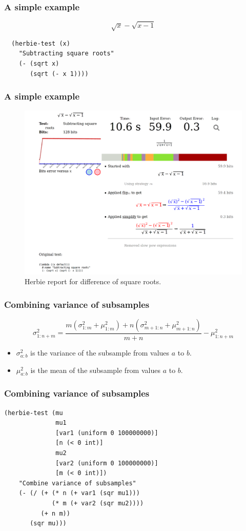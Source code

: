 \documentclass{beamer}
\begin{document}
\begin{frame}[fragile]
  \frametitle{A simple example}
  \[\sqrt{x} - \sqrt{x - 1}\]

  \begin{verbatim}
  (herbie-test (x)
    "Subtracting square roots"
    (- (sqrt x)
       (sqrt (- x 1))))
  \end{verbatim}
\end{frame}

\begin{frame}
  \frametitle{A simple example}
  \begin{figure}
    \includegraphics[scale=0.12]{img/simple-example}
    \caption{Herbie report for difference of square roots.}
  \end{figure}
\end{frame}

\begin{frame}
  \frametitle{Combining variance of subsamples}
  \[\sigma_{1:n+m}^2 = \frac{m(\sigma_{1:m}^2 + \mu_{1:m}^2) + n(\sigma_{m+1:n}^2 + \mu_{m+1:n}^2)}{m + n} - \mu_{1:n+m}^2\]
  \begin{itemize}
  \item \(\sigma_{a:b}^2\) is the variance of the subsample from
    values \(a\) to \(b\).
  \item \(\mu_{a:b}^2\) is the mean of the subsample from values \(a\)
    to \(b\).
  \end{itemize}
\end{frame}

\begin{frame}[fragile]
  \frametitle{Combining variance of subsamples}

  \begin{verbatim}
(herbie-test (mu
              mu1
              [var1 (uniform 0 100000000)]
              [n (< 0 int)]
              mu2
              [var2 (uniform 0 100000000)]
              [m (< 0 int)])
    "Combine variance of subsamples"
    (- (/ (+ (* n (+ var1 (sqr mu1)))
             (* m (+ var2 (sqr mu2))))
          (+ n m))
       (sqr mu)))
  \end{verbatim}
\end{frame}
\end{document}
